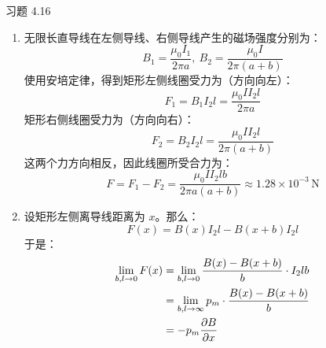 \begin{problem}
	习题 4.16
	\begin{solution}
		\begin{enumerate}
			\item[\textbf{1)}] 无限长直导线在左侧导线、右侧导线产生的磁场强度分别为：
			$$
			B_1 = \frac{\mu_0 I_1}{2 \pi a},\ B_2 = \frac{\mu_0 I}{2 \pi (a + b)}
			$$
			使用安培定律，得到矩形左侧线圈受力为（方向向左）：
			$$
			F_1 = B_1 I_2 l = \frac{\mu_0 I I_2 l}{2 \pi a}
			$$
			矩形右侧线圈受力为（方向向右）：
			$$
			F_2 = B_2 I_2 l = \frac{\mu_0 I I_2 l}{2 \pi (a + b)}
			$$
			这两个力方向相反，因此线圈所受合力为：
			$$
			F = F_1 - F_2 = \frac{\mu_0 I I_2 l b}{2 \pi a (a + b)} \approx 1.28 \times 10^{-3} \,\mathrm{N}
			$$

			\item[\textbf{2)}] 设矩形左侧离导线距离为 $x$。那么：
			$$
			F(x) = B(x) I_2 l - B(x + b) I_2 l
			$$
			于是：
			$$
			\begin{aligned}
				\lim_{b, l \to 0} F(x) & = \lim_{b, l \to 0} \frac{B(x) - B(x + b)}{b} \cdot I_2 l b \\
				& = \lim_{b, l \to \infty} p_m \cdot \frac{B(x) - B(x + b)}{b} \\
				& = -p_m \pdv{B}{x}
			\end{aligned}
			$$
		\end{enumerate}
	\end{solution}
\end{problem}
